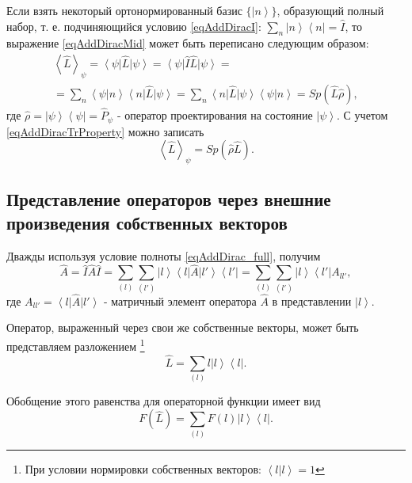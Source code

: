 Если взять некоторый ортонормированный базис $\{\left| n \right>\}$,
образующий полный набор, т. е. подчиняющийся условию
\eqref{eqAddDiracI}: $\sum_n \left| n \right>\left< n \right| =
\hat{I}$, то выражение \eqref{eqAddDiracMid}
может быть переписано следующим образом:
\begin{eqnarray}
\left< \hat{L} \right>_{\psi} = 
\left<\psi\right|\hat{L}\left|\psi\right> = 
\left<\psi\right|\hat{I}\hat{L}\left|\psi\right> = 
\nonumber \\
= 
\sum_n \left<\psi\right|\left.n\right>\left<n\right|
\hat{L}\left|\psi\right> = 
\sum_n \left<n\right|
\hat{L}\left|\psi\right>\left<\psi\right|\left.n\right> = 
Sp \left(\hat{L} \hat{\rho} \right),
\nonumber
\end{eqnarray}
где 
\(
\hat{\rho} = \left|\psi\right>\left<\psi\right| = \hat{P}_{\psi}
\) - оператор проектирования на состояние 
$\left| \psi \right>$.
С учетом \eqref{eqAddDiracTrProperty} можно записать
\begin{equation}
\left< \hat{L} \right>_{\psi} = Sp \left(\hat{\rho} \hat{L} \right).
\label{eqAddDiracMidViaRho}
\end{equation}

\subsection{Представление  операторов  через  внешние  произведения  
собственных  векторов}
Дважды используя условие полноты \eqref{eqAddDirac_full}, получим
\begin{equation}
\hat{A} = \hat{I} \hat{A} \hat{I} = \sum_{(l)}\sum_{(l')} 
\left|l\right>\left<l\right| \hat{A} \left|l'\right>\left<l'\right| = 
\sum_{(l)}\sum_{(l')} 
\left|l\right>\left<l'\right| A_{ll'},
\end{equation}  
где $A_{ll'} = \left<l\right| \hat{A} \left|l'\right>$ - матричный
элемент оператора $\hat{A}$  в представлении  $\left|l\right>$.
 
Оператор, выраженный через свои же собственные векторы, может быть
представляем разложением \footnote{При условии
 нормировки собственных векторов: $\left<l\right|\left.l\right> = 1$} 
\begin{equation}
\hat{L} = \sum_{(l)} 
l \left|l\right>\left<l\right|.
\end{equation}  

Обобщение этого равенства для операторной функции имеет вид
\begin{equation}
F\left(\hat{L}\right) = \sum_{(l)} 
F\left(l\right) \left|l\right>\left<l\right|.
\label{eqAddDiracFL}
\end{equation}  

